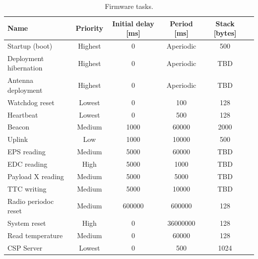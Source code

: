 \begin{table}[!h]
    \centering
    \begin{tabular}{lccccc}
        \toprule[1.5pt]
        \textbf{Name}          & \textbf{Priority} & \textbf{Initial delay [ms]} & \textbf{Period [ms]} & \textbf{Stack [bytes]} \\
        \midrule
        Startup (boot)         & Highest           & 0                           & Aperiodic            & 500                    \\
        Deployment hibernation & Highest           & 0                           & Aperiodic            & TBD                    \\
        Antenna deployment     & Highest           & 0                           & Aperiodic            & TBD                    \\
        Watchdog reset         & Lowest            & 0                           & 100                  & 128                    \\
        Heartbeat              & Lowest            & 0                           & 500                  & 128                    \\
        Beacon                 & Medium            & 1000                        & 60000                & 2000                   \\
        Uplink                 & Low               & 1000                        & 10000                & 500                    \\
        EPS reading            & Medium            & 5000                        & 60000                & TBD                    \\
        EDC reading            & High              & 5000                        & 1000                 & TBD                    \\
        Payload X reading      & Medium            & 5000                        & 5000                 & TBD                    \\
        TTC writing            & Medium            & 5000                        & 10000                & TBD                    \\
        Radio periodoc reset   & Medium            & 600000                      & 600000               & 128                    \\
        System reset           & High              & 0                           & 36000000             & 128                    \\
        Read temperature       & Medium            & 0                           & 60000                & 128                    \\
        CSP Server             & Lowest            & 0                           & 500                  & 1024                   \\
        \bottomrule[1.5pt]
    \end{tabular}
    \caption{Firmware tasks.}
    \label{tab:firmware-tasks}
\end{table}

